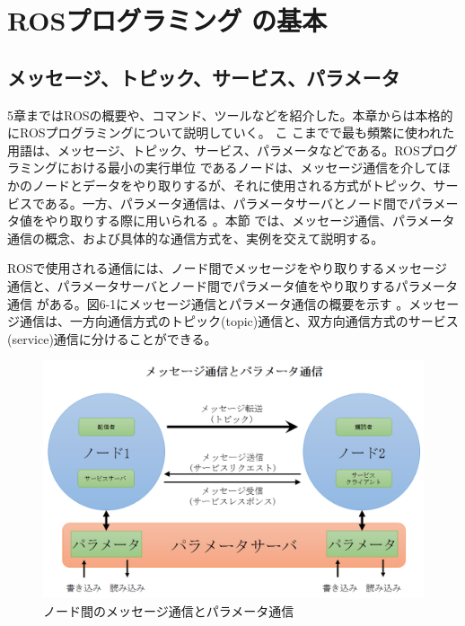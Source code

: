 
\chapter{ROSプログラミング  の基本}

\section{メッセージ、トピック、サービス、パラメータ}

5章まではROSの概要や、コマンド、ツールなどを紹介した。本章からは本格的にROSプログラミングについて説明していく。
こ  こまでで最も頻繁に使われた用語は、メッセージ、トピック、サービス、パラメータなどである。ROSプログラミングにおける最小の実行単位  であるノードは、メッセージ通信を介してほかのノードとデータをやり取りするが、それに使用される方式がトピック、サービスである。一方、パラメータ通信は、パラメータサーバとノード間でパラメータ値をやり取りする際に用いられる  。本節  では、メッセージ通信、パラメータ通信の概念、および具体的な通信方式を、実例を交えて説明する。

\begin{definition*}[ROSで使用される通信]
ROSで使用される通信には、ノード間でメッセージをやり取りするメッセージ通信と、パラメータサーバとノード間でパラメータ値をやり取りするパラメータ通信    がある。図6-1にメッセージ通信とパラメータ通信の概要を示す 。メッセージ通信は、一方向通信方式のトピック(topic)通信と、双方向通信方式のサービス(service)通信に分けることができる。
\end{definition*}

\begin{figure}[htp]
  \centering
  \includegraphics[width=\columnwidth]{pictures/chapter6/pic_06_01.png}
  \caption{ノード間のメッセージ通信とパラメータ通信}
\end{figure}

